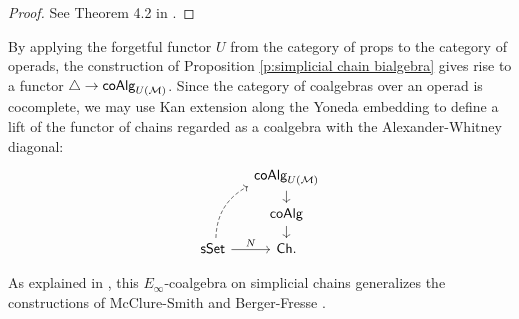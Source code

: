 \begin{proof}
	See Theorem 4.2 in \cite{Medina20prop1}.
\end{proof}

 By applying the forgetful functor $U$ from the category of props to the category of operads, the construction of Proposition \ref{p:simplicial chain bialgebra} gives rise to a functor $\triangle \to \mathsf{coAlg}_{U(\mathcal{M})}$. Since the category of coalgebras over an operad is cocomplete, we may use Kan extension along the Yoneda embedding to define a lift of the functor of chains regarded as a coalgebra with the Alexander-Whitney diagonal:
\begin{equation*}
\begin{tikzcd}[column sep=small, row sep=small]
& \coAlg_{U(\M)} \arrow[d] \\
& \coAlg \arrow[d] \\
\sSet \arrow[r, "N"] \arrow[dashed, uur, bend left]& \Ch.
\end{tikzcd}
\end{equation*}

As explained in \cite{Medina20prop1}, this $E_\infty$-coalgebra on simplicial chains generalizes the constructions of McClure-Smith \cite{McClure-Smith} and Berger-Fresse \cite{Berger-Fresse}.